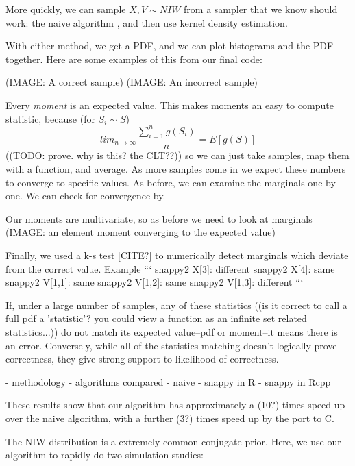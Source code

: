 \documentclass[english]{report}
\begin{document}
More quickly, we can sample $X,V \sim NIW$ from a sampler that we know should work: the naive algorithm %
  , and then use kernel density estimation.
  
With either method, we get a PDF, and we can plot histograms and the PDF together. Here are some examples of this from our final code:

(IMAGE: A correct sample)
(IMAGE: An incorrect sample)


Every \emph{moment} is an expected value. This makes moments an easy to compute statistic,
 because (for $ S_i \sim S $)
$$ lim_{n \rightarrow \infty} \frac{\sum_{i=1}^n g(S_i)}{n} = E[g(S)] $$
  ((TODO: prove. why is this? the CLT??))
so we can just take samples, map them with a function, and average. As more samples come in we expect these numbers to converge to specific values. As before, we can examine the marginals one by one. We can check for convergence by.

Our moments are multivariate, so as before we need to look at marginals 
(IMAGE: an element moment converging to the expected value)

Finally, we used a k-s test [CITE?] to numerically detect marginals which deviate from the correct value. Example 
```
snappy2 X[3]: different
snappy2 X[4]: same
snappy2 V[1,1]: same
snappy2 V[1,2]: same
snappy2 V[1,3]: different
```


If, under a large number of samples, any of these statistics ((is it correct to call a full pdf a 'statistic'? you could view a function as an infinite set related statistics...)) do not match its expected value--pdf or moment--it means there is an error. Conversely, while all of the statistics matching doesn't logically prove correctness, they give strong support to likelihood of correctness.




- methodology
- algorithms compared
  - naive
  - snappy in R
  - snappy in Rcpp

These results show that our algorithm has approximately a (10?) times speed up over the naive algorithm, with a further (3?) times speed up by the port to C.


The NIW distribution is a extremely common conjugate prior. Here, we use our algorithm to rapidly do two simulation studies:
\end{document}
